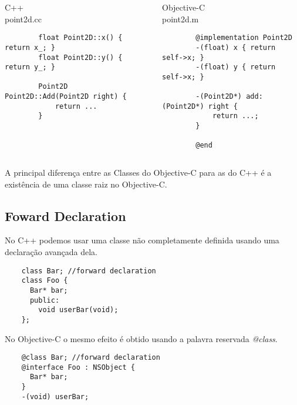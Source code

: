 \documentclass[brazil]{beamer}
\begin{document}
\begin{frame}[fragile]
  \begin{columns}
    \begin{column}{.5\textwidth}
      \begin{center}
        C++ \\
        point2d.cc
      \end{center}
      \lstset{language=C++,basicstyle=\tiny}
      \begin{lstlisting}
        float Point2D::x() { return x_; }
        float Point2D::y() { return y_; }

        Point2D Point2D::Add(Point2D right) {
            return ...
        }
      \end{lstlisting}
    \end{column}
    \begin{column}{.5\textwidth}
      \begin{center}
        Objective-C \\
        point2d.m
      \end{center}
      \lstset{language=C++,basicstyle=\tiny}
      \begin{lstlisting}
        @implementation Point2D
        -(float) x { return self->x; }
        -(float) y { return self->x; }

        -(Point2D*) add: (Point2D*) right {
            return ...;
        }

        @end
      \end{lstlisting}
    \end{column}
  \end{columns}
\end{frame}

\begin{frame}
  A principal diferença entre as Classes do Objective-C para as do C++ é a existência de uma classe
  raiz no Objective-C.
\end{frame}

\subsection{Foward Declaration}

\begin{frame}[fragile]
  No C++ podemos usar uma classe não completamente definida usando uma declaração avançada dela. \\
  \lstset{language=C++,basicstyle=\tiny}
  \begin{lstlisting}
    class Bar; //forward declaration 
    class Foo { 
      Bar* bar; 
      public:
        void userBar(void);
    };
  \end{lstlisting}
  No Objective-C o mesmo efeito é obtido usando a palavra reservada \textit{@class}.
  \lstset{language=C++,basicstyle=\tiny}
  \begin{lstlisting}
    @class Bar; //forward declaration 
    @interface Foo : NSObject { 
      Bar* bar; 
    }
    -(void) userBar;
  \end{lstlisting}
\end{frame}
\end{document}
